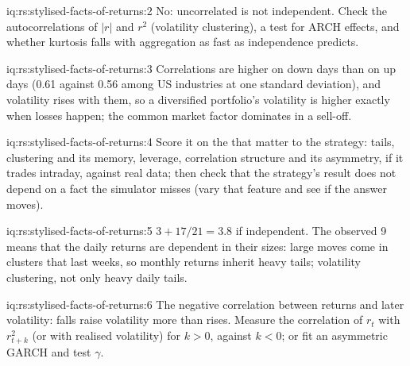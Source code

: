 \begin{solution}{iq:rs:stylised-facts-of-returns:2}
No: uncorrelated is not independent. Check the autocorrelations of $|r|$ and $r^2$ (volatility clustering), a test for ARCH effects,
and whether kurtosis falls with aggregation as fast as independence predicts.
\end{solution}

\begin{solution}{iq:rs:stylised-facts-of-returns:3}
Correlations are higher on down days than on up days (0.61 against 0.56 among US industries at one standard deviation), and
volatility rises with them, so a diversified portfolio's volatility is higher exactly when losses happen; the common market factor
dominates in a sell-off.
\end{solution}

\begin{solution}{iq:rs:stylised-facts-of-returns:4}
Score it on the  that matter to the strategy: tails, clustering and its memory, leverage, correlation structure and its
asymmetry,  if it trades intraday, against real data; then check that the strategy's result does not depend on a
fact the simulator misses (vary that feature and see if the answer moves).
\end{solution}

\begin{solution}{iq:rs:stylised-facts-of-returns:5}
$3 + 17/21 = 3.8$ if independent. The observed 9 means that the daily returns are dependent in their sizes: large moves come in
clusters that last weeks, so monthly returns inherit heavy tails; volatility clustering, not only heavy daily tails.
\end{solution}

\begin{solution}{iq:rs:stylised-facts-of-returns:6}
The negative correlation between returns and later volatility: falls raise volatility more than rises. Measure the correlation of
$r_t$ with $r_{t+k}^2$ (or with realised volatility) for $k > 0$, against $k < 0$; or fit an asymmetric GARCH and test $\gamma$.
\end{solution}
